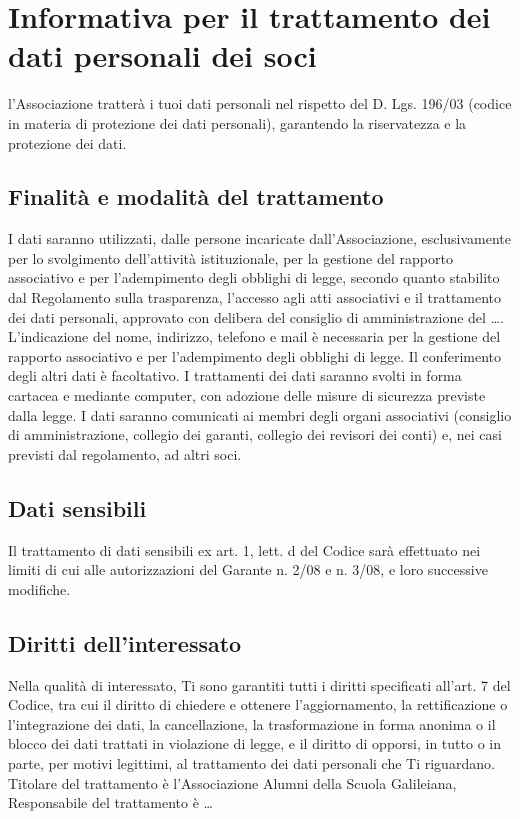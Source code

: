 \newpage
\section*{Informativa per il trattamento dei dati personali dei soci}
l’Associazione tratterà i tuoi dati personali nel rispetto del D. Lgs. 196/03
(codice in materia di protezione dei dati personali), garantendo la
riservatezza e la protezione dei dati.
\subsection*{Finalità e modalità del trattamento}
I dati saranno utilizzati, dalle persone incaricate dall’Associazione,
esclusivamente per lo svolgimento dell’attività istituzionale, per la
gestione del rapporto associativo e per l’adempimento degli obblighi di
legge, secondo quanto stabilito dal Regolamento sulla trasparenza, l'accesso
agli atti associativi e il trattamento dei dati personali, approvato con
delibera del consiglio di amministrazione del \ldots.
L’indicazione del nome, indirizzo, telefono e mail è necessaria per la
gestione del rapporto associativo e per l’adempimento degli obblighi di
legge. Il conferimento degli altri dati è facoltativo. I trattamenti dei
dati saranno svolti in forma cartacea e mediante computer, con adozione
delle misure di sicurezza previste dalla legge.
I dati saranno comunicati ai membri degli organi associativi (consiglio di
amministrazione, collegio dei garanti, collegio dei revisori dei conti) e,
nei casi previsti dal regolamento, ad altri soci.
\subsection*{Dati sensibili}
Il trattamento di dati
sensibili ex art. 1, lett. d del Codice sarà effettuato nei limiti di cui alle
autorizzazioni del Garante n. 2/08 e n. 3/08, e loro successive modifiche.
\subsection*{Diritti dell'interessato}
Nella qualità di interessato, Ti sono garantiti tutti i
diritti specificati all’art. 7 del Codice, tra cui il diritto di chiedere e ottenere
l’aggiornamento, la rettificazione o l’integrazione dei dati, la cancellazione,
la trasformazione in forma anonima o il blocco dei dati trattati in violazione
di legge, e il diritto di opporsi, in tutto o in parte, per motivi legittimi, al
trattamento dei dati personali che Ti riguardano. Titolare del trattamento
è l’Associazione Alumni della Scuola Galileiana,
Responsabile del trattamento è \ldots

